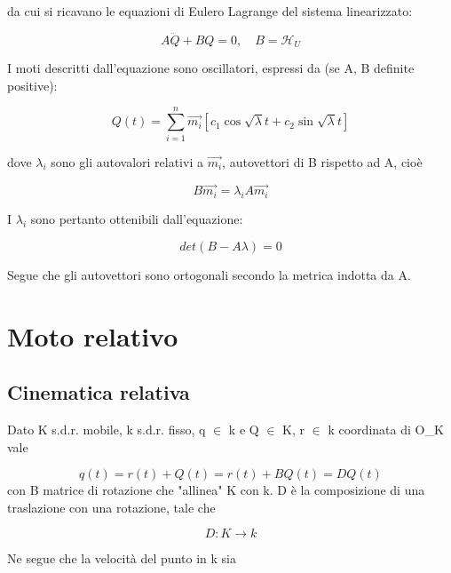 \documentclass{article}
\begin{document}
        da cui si ricavano le equazioni di Eulero Lagrange del sistema linearizzato:

        \begin{equation}
            A\ddot{Q} + BQ = 0, \quad B = \mathcal{H}_U
        \end{equation}

        I moti descritti dall'equazione sono oscillatori, espressi da (se A, B definite positive):

        \begin{equation}
            Q(t)=\sum_{i=1}^n \vec{m_i}[c_1 \cos{\sqrt{\lambda}t}+c_2 \sin{\sqrt{\lambda}t}]
        \end{equation}

        dove $\lambda_i$ sono gli autovalori relativi a $\Vec{m_i}$, autovettori di B rispetto ad A, cioè

        \begin{equation}
            B \vec{m_i}=\lambda_iA\vec{m_i}
        \end{equation}

        I $\lambda_i$ sono pertanto ottenibili dall'equazione:

        \begin{equation}
            det(B-A\lambda)=0
        \end{equation}

        Segue che gli autovettori sono ortogonali secondo la metrica indotta da A.

        \section{Moto relativo}
        \subsection{Cinematica relativa}
        Dato K s.d.r. mobile, k s.d.r. fisso, q $\in$ k e Q $\in$ K, r $\in$ k coordinata di O\_K vale

\begin{equation}
    q(t)=r(t)+Q(t)= r(t)+ BQ(t)= DQ(t)
\end{equation}
con B matrice di rotazione che "allinea" K con k. D è la composizione di una traslazione con una rotazione, tale che

\begin{equation}
    D: K \rightarrow k
\end{equation}

Ne segue che la velocità del punto in k sia
\end{document}
